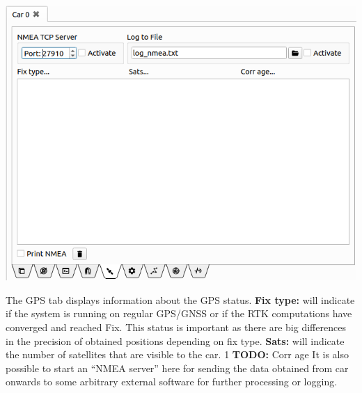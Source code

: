 \documentclass[12pt]{article} %
\def\printtodos{0}
\newcommand{\todo}[1]{
  \if\printtodos1
      {\color{red} \textbf{TODO:} #1}
  \fi}
\begin{document}
\noindent\begin{minipage}{0.5\textwidth}
  \noindent \includegraphics[width=\textwidth]{./screens/Car_GPS.png}
\end{minipage}
\begin{minipage}{0.5\textwidth} %
   The GPS tab displays information about the GPS
  status. {\bf Fix type:} will indicate if the system is running on
  regular GPS/GNSS or if the RTK computations have converged and
  reached Fix. This status is important as there are big differences
  in the precision of obtained positions depending on fix type. {\bf Sats:} will indicate
  the number of satellites that are visible to the car. \todo{Corr age}
  It is also possible to start an ``NMEA server'' here for sending the
  data obtained from car onwards to some arbitrary external software
  for further processing or logging.
\end{minipage}
\end{document}
